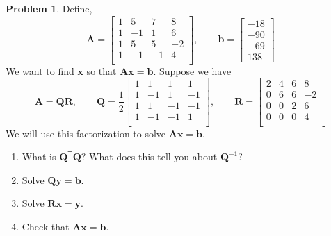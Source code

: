 \documentclass[12pt]{article}
\theoremstyle{definition}
\newtheorem{problem}{Problem}
\renewcommand{\vec}{\mathbf}
\newcommand{\T}{\mathsf{T}}
\begin{document}
    \clearpage
    \begin{problem}
    Define,
    \begin{equation*}
        \vec{A} =
        \begin{bmatrix}
     1 & 5 & 7 & 8 \\
     1 & -1 & 1 & 6 \\
     1 & 5 & 5 & -2 \\
     1 & -1 & -1 & 4 \\
        \end{bmatrix}
        ,\qquad
        \vec{b} = 
        \begin{bmatrix}-18\\-90\\-69\\138\end{bmatrix}
        \end{equation*}
        We want to find $\vec{x}$ so that $\vec{A}\vec{x} = \vec{b}$.
        Suppose we have
        \[
        \vec{A} = \vec{Q}\vec{R},\qquad
        \vec{Q} = 
        \frac{1}{2}\begin{bmatrix}
     1 & 1 & 1 & 1 \\
     1 & -1 & 1 & -1 \\
     1 & 1 & -1 & -1 \\
     1 & -1 & -1 & 1 \\
        \end{bmatrix}
        ,\qquad
        \vec{R} = 
        \begin{bmatrix}
     2 & 4 & 6 & 8 \\
     0 & 6 & 6 & -2 \\
     0 & 0 & 2 & 6 \\
     0 & 0 & 0 & 4 \\
        \end{bmatrix}
        \]
        We will use this factorization to solve $\vec{A} \vec{x} = \vec{b}$.

        \begin{enumerate}
            \item 
            What is $\vec{Q}^\T \vec{Q}$? What does this tell you about $\vec{Q}^{-1}$?
            \item Solve $\vec{Q}\vec{y} = \vec{b}$.
            \item Solve $\vec{R}\vec{x} = \vec{y}$.
            \item Check that $\vec{A}\vec{x} = \vec{b}$.
        \end{enumerate}

    \end{problem}
\end{document}
